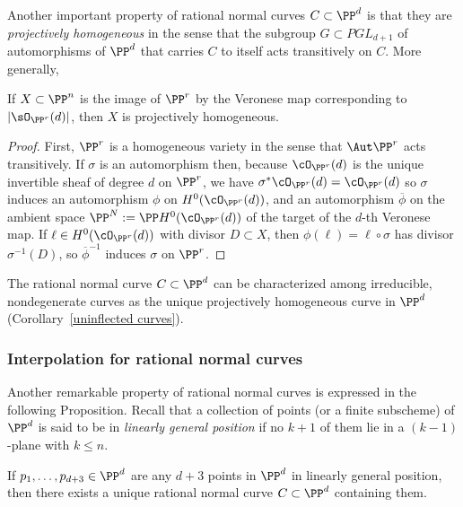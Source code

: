 Another important property of rational normal curves $C \subset \PP^d$ is that they are \emph{projectively homogeneous} in the sense that the subgroup $G\subset PGL_{d+1}$ of automorphisms of $\PP^d$ that carries $C$ to itself acts transitively on $C$. More generally,

\begin{proposition}\label{Veronese is projectively homogeneous}
If $X\subset \PP^n$ is the image of $\PP^r$ by the Veronese map corresponding to $|\sO_{\PP^r}(d)|$, then $X$ is projectively homogeneous.
\end{proposition}
\begin{proof}
First, $\PP^r$ is a homogeneous variety in the sense that $\Aut \PP^r$ acts transitively. If $\sigma$ is an automorphism then,
 because $\cO_{\PP^r}(d)$ is the unique
invertible sheaf of degree $d$ on $\PP^r$,  we have $\sigma^*\cO_{\PP^r}(d) = \cO_{\PP^r}(d)$ so $\sigma$ induces an automorphism $\phi$ on $H^0(\cO_{\PP^r}(d))$, and an automorphism $\overline \phi$ on the ambient space 
$\PP^{N} := \PP H^0(\cO_{\PP^r}(d))$ of the target of the $d$-th Veronese map. If $\ell \in H^0(\cO_{\PP^r}(d))$
 with divisor $D\subset X$, then $\phi(\ell) = \ell \circ \sigma$ has divisor $\sigma^{-1}(D)$, so $\overline\phi^{-1}$ induces $\sigma$ on $\PP^r$. 
\end{proof}

The rational normal curve $C \subset \PP^d$ can  be characterized among irreducible, nondegenerate curves as the unique projectively homogeneous curve in $\PP^d$ (Corollary~\ref{uninflected curves}).

\subsubsection{Interpolation for rational normal curves}\label{def of linearly general}

Another remarkable property of rational normal curves is expressed in the following Proposition. Recall that a collection of points (or a finite subscheme)
of $\PP^d$ is said to be in \emph{linearly general position} if no $k+1$ of them lie in a $(k-1)$-plane with $k\leq n$. 

\begin{proposition}\label{points on rnc}
If $p_1,\dots, p_{d+3} \in \PP^d$ are any $d+3$ points in $\PP^d$ in linearly general position, then there exists a unique rational normal curve $C \subset \PP^d$ containing them.
 \end{proposition}

